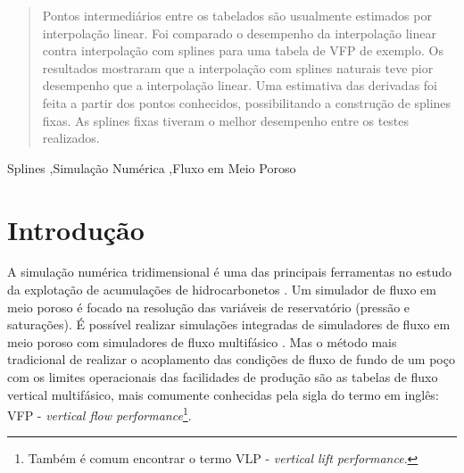 \documentclass[final,5p]{elsarticle}
\numberwithin{equation}{section}
\begin{document}
\begin{frontmatter}
\begin{abstract}
    Pontos intermediários entre os tabelados são usualmente estimados por interpolação linear. Foi comparado o desempenho da interpolação linear contra interpolação com splines para uma tabela de VFP de exemplo. Os resultados mostraram que a interpolação com splines naturais teve pior desempenho que a interpolação linear. Uma estimativa das derivadas foi feita a partir dos pontos conhecidos, possibilitando a construção de splines fixas. As splines fixas tiveram o melhor desempenho entre os testes realizados. 

\end{abstract}




\begin{keyword}
    Splines \sep Simulação Numérica \sep Fluxo em Meio Poroso



\end{keyword}

\end{frontmatter}


\section{Introdução}

    A simulação numérica tridimensional é uma das principais ferramentas no estudo da explotação de acumulações de hidrocarbonetos \cite{ReservoirSimulationErtekin}. Um simulador de fluxo em meio poroso é focado na resolução das variáveis de reservatório (pressão e saturações). É possível realizar simulações integradas de simuladores de fluxo em meio poroso com simuladores de fluxo multifásico \cite{10.2118/195477-MS}. Mas o método mais tradicional de realizar o acoplamento das condições de fluxo de fundo de um poço com os limites operacionais das facilidades de produção são as tabelas de fluxo vertical multifásico, mais comumente conhecidas pela sigla do termo em inglês: VFP - \emph{vertical flow performance}\footnote{Também é comum encontrar o termo VLP - \emph{vertical lift performance}.}.
\end{document}
